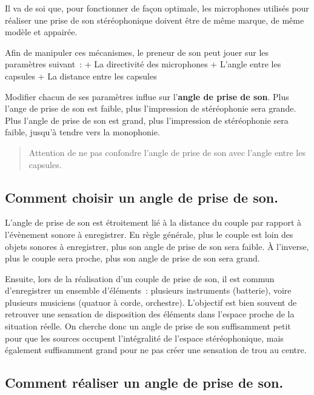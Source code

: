 \documentclass[
]{book}
\begin{document}
Il va de soi que, pour fonctionner de façon optimale, les microphones utilisés pour réaliser une prise de son stéréophonique doivent être de même marque, de même modèle et appairée.

Afin de manipuler ces mécanismes, le preneur de son peut jouer sur les paramètres suivant~:
+ La directivité des microphones
+ L'angle entre les capsules
+ La distance entre les capsules

Modifier chacun de ses paramètres influe sur l'\textbf{angle de prise de son}. Plus l'ange de prise de son est faible, plus l'impression de stéréophonie sera grande. Plus l'angle de prise de son est grand, plus l'impression de stéréophonie sera faible, jusqu'à tendre vers la monophonie.

\begin{quote}
Attention de ne pas confondre l'angle de prise de son avec l'angle entre les capsules.
\end{quote}

\hypertarget{comment-choisir-un-angle-de-prise-de-son.}{%
\subsection{Comment choisir un angle de prise de son.}\label{comment-choisir-un-angle-de-prise-de-son.}}

L'angle de prise de son est étroitement lié à la distance du couple par rapport à l'évènement sonore à enregistrer. En règle générale, plus le couple est loin des objets sonores à enregistrer, plus son angle de prise de son sera faible. À l'inverse, plus le couple sera proche, plus son angle de prise de son sera grand.

Ensuite, lors de la réalisation d'un couple de prise de son, il est commun d'enregistrer un ensemble d'éléments~: plusieurs instruments (batterie), voire plusieurs musiciens (quatuor à corde, orchestre). L'objectif est bien souvent de retrouver une sensation de disposition des éléments dans l'espace proche de la situation réelle. On cherche donc un angle de prise de son suffisamment petit pour que les sources occupent l'intégralité de l'espace stéréophonique, mais également suffisamment grand pour ne pas créer une sensation de trou au centre.

\hypertarget{comment-ruxe9aliser-un-angle-de-prise-de-son.}{%
\subsection{Comment réaliser un angle de prise de son.}\label{comment-ruxe9aliser-un-angle-de-prise-de-son.}}
\end{document}
